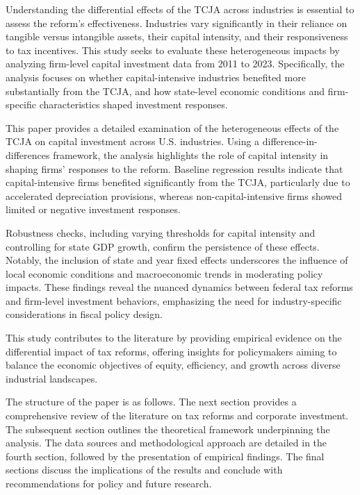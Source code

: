 \documentclass[11pt]{article}
\begin{document}
Understanding the differential effects of the TCJA across industries is essential to assess the reform's effectiveness. Industries vary significantly in their reliance on tangible versus intangible assets, their capital intensity, and their responsiveness to tax incentives. This study seeks to evaluate these heterogeneous impacts by analyzing firm-level capital investment data from 2011 to 2023. Specifically, the analysis focuses on whether capital-intensive industries benefited more substantially from the TCJA, and how state-level economic conditions and firm-specific characteristics shaped investment responses.

This paper provides a detailed examination of the heterogeneous effects of the TCJA on capital investment across U.S. industries. Using a difference-in-differences framework, the analysis highlights the role of capital intensity in shaping firms’ responses to the reform. Baseline regression results indicate that capital-intensive firms benefited significantly from the TCJA, particularly due to accelerated depreciation provisions, whereas non-capital-intensive firms showed limited or negative investment responses.

Robustness checks, including varying thresholds for capital intensity and controlling for state GDP growth, confirm the persistence of these effects. Notably, the inclusion of state and year fixed effects underscores the influence of local economic conditions and macroeconomic trends in moderating policy impacts. These findings reveal the nuanced dynamics between federal tax reforms and firm-level investment behaviors, emphasizing the need for industry-specific considerations in fiscal policy design.

This study contributes to the literature by providing empirical evidence on the differential impact of tax reforms, offering insights for policymakers aiming to balance the economic objectives of equity, efficiency, and growth across diverse industrial landscapes.


The structure of the paper is as follows. The next section provides a comprehensive review of the literature on tax reforms and corporate investment. The subsequent section outlines the theoretical framework underpinning the analysis. The data sources and methodological approach are detailed in the fourth section, followed by the presentation of empirical findings. The final sections discuss the implications of the results and conclude with recommendations for policy and future research.
\end{document}
